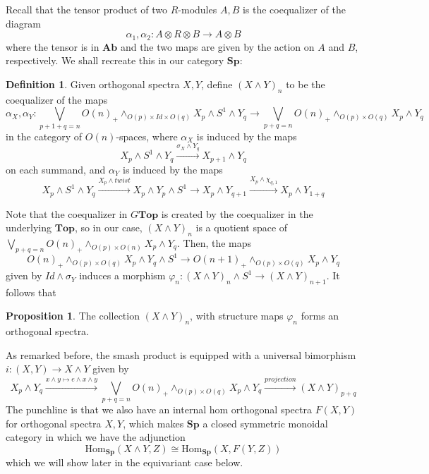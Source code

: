 \documentclass{article}
\theoremstyle{definition}
\newtheorem{definition}[theorem]{Definition}
\newtheorem{proposition}[theorem]{Proposition}
\begin{document}
Recall that the tensor product of two $R$-modules $A,B$ is the coequalizer of the diagram 
\[\alpha_1,\alpha_2: A\otimes R\otimes B\to A\otimes B\]
where the tensor is in $\textbf{Ab}$ and the two maps are given by the action on $A$ and $B$, respectively. We shall recreate this in our category $\textbf{Sp}$:


\begin{tcolorbox}[colback=purple!5!white,colframe=purple!75!black]
\begin{definition}
Given orthogonal spectra $X,Y$, define $(X\wedge Y)_n$ to be the coequalizer of the maps
\[\alpha_X,\alpha_Y: \bigvee_{p+1+q=n}O(n)_+\wedge_{O(p)\times Id\times O(q)}X_p\wedge S^1\wedge Y_q\to  \bigvee_{p+q=n}O(n)_+\wedge_{O(p)\times O(q)}X_p\wedge Y_q\]
in the category of $O(n)$-spaces, where $\alpha_X$ is induced by the maps
\[X_p\wedge S^1\wedge Y_q\xrightarrow{\sigma_X\wedge Y_q} X_{p+1}\wedge Y_q\] on each summand, and $\alpha_Y$ is induced by the maps 
\[X_p\wedge S^1\wedge Y_q\xrightarrow{X_p\wedge twist}X_p\wedge Y_p\wedge S^1\to X_{p}\wedge Y_{q+1}\xrightarrow{X_p\wedge \chi_{q,1}} X_{p}\wedge Y_{1+q}\]
\end{definition}
\end{tcolorbox}
Note that the coequalizer in $G\textbf{Top}$ is created by the coequalizer in the underlying $\textbf{Top}$, so in our case, $(X\wedge Y)_n$ is a quotient space of 
$\bigvee_{p+q=n}O(n)_+\wedge_{O(p)\times O(n)}X_p\wedge Y_q$. Then, the maps 
\[O(n)_+\wedge_{O(p)\times O(q)}X_p\wedge Y_q\wedge S^1\to O(n+1)_+\wedge_{O(p)\times O(q)}X_p\wedge Y_q\]
given by $Id\wedge \sigma_Y$ induces a morphism $\varphi_n:(X\wedge Y)_n\wedge S^1\to (X\wedge Y)_{n+1}$. It follows that 

\begin{tcolorbox}[colback=blue!5!white,colframe=blue!30!white]
\begin{proposition}
The collection $(X\wedge Y)_n$, with structure maps $\varphi_n$ forms an orthogonal spectra. 
\end{proposition}
\end{tcolorbox}

As remarked before, the smash product is equipped with a universal bimorphism $i: (X,Y)\to X\wedge Y$ given by 
\[X_p\wedge Y_q\xrightarrow{x\wedge y\mapsto e\wedge x\wedge y} \bigvee_{p+q=n}O(n)_+\wedge_{O(p)\times O(q)}X_p\wedge Y_q\xrightarrow{projection} (X\wedge Y)_{p+q}\]
The punchline is that we also have an internal hom orthogonal spectra $F(X,Y)$ for orthogonal spectra $X,Y$, which makes $\textbf{Sp}$ a closed symmetric monoidal category in which we have the adjunction 
\[\textrm{Hom}_{\textbf{Sp}}(X\wedge Y,Z)\cong \textrm{Hom}_{\textbf{Sp}}(X,F(Y,Z))\]
which we will show later in the equivariant case below. 
\end{document}
